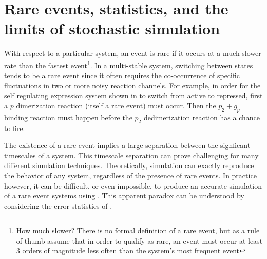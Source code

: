 
\section{Rare events, statistics, and the limits of stochastic simulation}

With respect to a particular system, an event is rare\supercite{Baron:2017tf} if it occurs at a much slower rate than the fastest event\footnote{How much slower? There is no formal definition of a rare event, but as a rule of thumb assume that in order to qualify as rare, an event must occur at least 3 orders of magnitude less often than the system's most frequent event}. In a multi-stable system, switching between states tends to be a rare event since it often requires the co-occurrence of specific fluctuations in two or more noisy reaction channels. For example, in order for the self regulating expression system shown in  to switch from active to repressed, first a $p$ dimerization reaction (itself a rare event) must occur. Then the $p_{2} + g_{p}$ binding reaction must happen before the $p_{2}$ dedimerization reaction has a chance to fire.

The existence of a rare event implies a large separation between the signficant timescales of  a system. This timescale separation can prove challenging\supercite{Shampine:1979em,Petzold:1983if} for many different simulation techniques. Theoretically,  simulation can exactly reproduce the behavior of any system, regardless of the presence of rare events. In practice however, it can be difficult, or even impossible, to produce an accurate simulation of a rare event systems using . This apparent paradox can be understood by considering the error statistics of .


